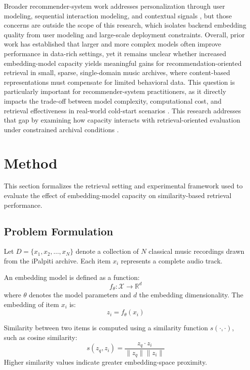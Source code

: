 \documentclass{article}
\begin{document}
Broader recommender-system work addresses personalization through user modeling, sequential
interaction modeling, and contextual signals \cite{lin2025, abbattista2024, schedl2021}, but those
concerns are outside the scope of this research, which isolates backend embedding quality from user
modeling and large-scale deployment constraints. 
Overall, prior work has established that larger and more complex models often improve performance in data-rich settings, yet it remains unclear whether increased embedding-model capacity yields meaningful gains for recommendation-oriented retrieval in small, sparse, single-domain music archives, where content-based representations must compensate for limited behavioral data.
This question is particularly important for recommender-system practitioners, as it directly impacts the trade-off between model complexity, computational cost, and retrieval effectiveness in real-world cold-start scenarios \cite{schedl2018, deldjoo2024, tamm2024}. This research addresses that gap by examining how capacity interacts with retrieval-oriented evaluation under constrained archival conditions \cite{tamm2024, krichene2020, canamares2020}.








\section{Method}\label{sec:method}\label{ch:problem}\label{ch:methodology}
This section formalizes the retrieval setting and experimental framework used to evaluate the effect of embedding-model capacity on similarity-based retrieval performance.

\subsection{Problem Formulation}

Let $D = \{x_1, x_2, \dots, x_N\}$ denote a collection of $N$ classical music recordings drawn from
the iPalpiti archive. Each item $x_i$ represents a complete audio track.

An embedding model is defined as a function:
\[
f_\theta : \mathcal{X} \rightarrow \mathbb{R}^d
\]
where $\theta$ denotes the model parameters and $d$ the embedding dimensionality. The embedding of
item $x_i$ is:
\[
z_i = f_\theta(x_i)
\]

Similarity between two items is computed using a similarity function $s(\cdot,\cdot)$, such as cosine
similarity:
\[
s(z_q, z_i) = \frac{z_q \cdot z_i}{\|z_q\|\|z_i\|}
\]
Higher similarity values indicate greater embedding-space proximity.
\end{document}
